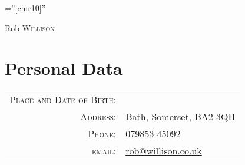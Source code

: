 \documentclass[a4paper,10pt]{article}
\begin{document}

\pagestyle{empty} %

\font\fb=''[cmr10]'' %

\par{\centering
		{Rob \textsc{Willison}
	}\bigskip\par}

\section{Personal Data}

\begin{tabular}{rl}
    \textsc{Place and Date of Birth:} & \\
    \textsc{Address:}   & Bath, Somerset, BA2 3QH\\
    \textsc{Phone:}     & 079853 45092\\
    \textsc{email:}     & \href{mailto:rob@willison.co.uk}{rob@willison.co.uk}
\end{tabular}

\end{document}
